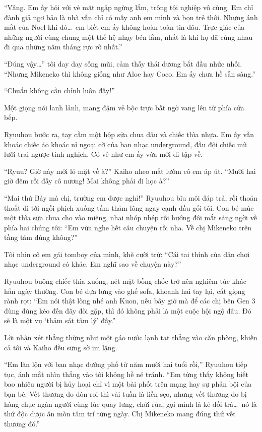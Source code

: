 \documentclass[../main.tex]{subfiles}
\begin{document}
``Vâng. Em ấy hỏi với vẻ mặt ngập ngừng lắm, trông tội nghiệp vô cùng. Em chỉ đành giả ngơ bảo là nhà vẫn chỉ có mấy anh em mình và bọn trẻ thôi. Nhưng ánh mắt của Noel khi đó\dots\ em biết em ấy không hoàn toàn tin đâu. Trực giác của những người cùng chung một thế hệ nhạy bén lắm, nhất là khi họ đã cùng nhau đi qua những năm tháng rực rỡ nhất.''

``Đúng vậy\dots'' tôi day day sống mũi, cảm thấy thái dương bắt đầu nhức nhối. ``Nhưng Mikeneko thì không giống như Aloe hay Coco. Em ấy chưa hề sẵn sàng.''

``Chuẩn không cần chỉnh luôn đấy!''

Một giọng nói lanh lảnh, mang đậm vẻ bộc trực bất ngờ vang lên từ phía cửa bếp.

Ryuuhou bước ra, tay cầm một hộp sữa chua dâu và chiếc thìa nhựa. Em ấy vẫn khoác chiếc áo khoác nỉ ngoại cỡ của ban nhạc underground, đầu đội chiếc mũ lưỡi trai ngược tinh nghịch. Có vẻ như em ấy vừa mới đi tập về.

``Ryuu? Giờ này mới ló mặt về à?'' Kaiho nheo mắt lườm cô em áp út. ``Mười hai giờ đêm rồi đấy cô nương! Mai không phải đi học à?''

``Mai thứ Bảy mà chị, trường em được nghỉ!'' Ryuuhou bĩu môi đáp trả, rồi thoăn thoắt đi tới ngồi phịch xuống tấm thảm lông ngay cạnh đầu gối tôi. Con bé múc một thìa sữa chua cho vào miệng, nhai nhóp nhép rồi hướng đôi mắt sáng ngời về phía hai chúng tôi: ``Em vừa nghe hết câu chuyện rồi nha. Về chị Mikeneko trên tầng tám đúng không?''

Tôi nhìn cô em gái tomboy của mình, khẽ cười trừ: ``Cái tai thính của dân chơi nhạc underground có khác. Em nghĩ sao về chuyện này?''

Ryuuhou buông chiếc thìa xuống, nét mặt bỗng chốc trở nên nghiêm túc khác hẳn ngày thường. Con bé dựa lưng vào ghế sofa, khoanh hai tay lại, cất giọng rành rọt: ``Em nói thật lòng nhé anh Kuon, nếu bây giờ mà để các chị bên Gen 3 đùng đùng kéo đến đây đòi gặp, thì đó không phải là một cuộc hội ngộ đâu. Đó sẽ là một vụ `thảm sát tâm lý' đấy.''

Lời nhận xét thẳng thừng như một gáo nước lạnh tạt thẳng vào căn phòng, khiến cả tôi và Kaiho đều sững sờ im lặng.

``Em lăn lộn với ban nhạc đường phố từ năm mười hai tuổi rồi,'' Ryuuhou tiếp tục, ánh mắt nhìn thẳng vào tôi không hề né tránh. ``Em từng thấy không biết bao nhiêu người bị hủy hoại chỉ vì một bài phốt trên mạng hay sự phản bội của bạn bè. Vết thương do đòn roi thì vài tuần là liền sẹo, nhưng vết thương do bị hàng chục ngàn người cùng lúc quay lưng, chửi rủa, gọi mình là kẻ dối trá\dots\ nó là thứ độc dược ăn mòn tâm trí từng ngày. Chị Mikeneko mang đúng thứ vết thương đó.''
\end{document}
